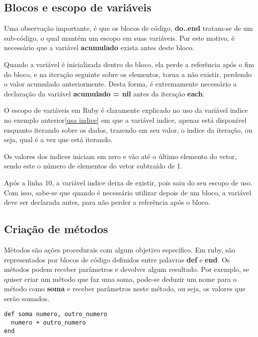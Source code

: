 \documentclass[espaco=simples,appendix=Name]{abnt}
\newcommand{\code}[1] {\textbf{#1}}
\begin{document}
\subsection{Blocos e escopo de variáveis}

Uma observação importante, é que os blocos de código, \code{do..end} tratam-se de um sub-código, o qual mantém um escopo em suas variáveis. Por este motivo, é necessário que a variável \code{acumulado} exista antes deste bloco. 

Quando a variável é inicializada dentro do bloco, ela perde a referência após o fim do bloco, e na iteração seguinte sobre os elementos, torna a não existir, perdendo o valor acumulado anteriormente. Desta forma, é extremamente necessário a declaração da variável \code{acumulado = nil} antes da iteração \code{each}.

O escopo de variáveis em Ruby é claramente explicado no uso da variável indice no exemplo anterior\ref{usa indice} em que a variável indice, apenas está disponível enquanto iterando sobre os dados, trazendo em seu valor, o indice da iteração, ou seja, qual é a vez que está iterando.

Os valores dos indices iniciam em zero e vão até o último elemento do vetor, sendo este o número de elementos do vetor subtraído de 1.

Após a linha 10, a variável indice deixa de existir, pois saiu do seu escopo de uso. Com isso, sabe-se que quando é necessário utilizar depois de um bloco, a variável deve ser declarada antes, para não perder a referência após o bloco.



\subsection{Criação de métodos}

Métodos são ações procedurais com algum objetivo específico. Em ruby, são representados por blocos de código definidos entre palavras \code{def} e \code{end}. Os métodos podem receber parâmetros e devolver algum resultado. Por exemplo, se quiser criar um método que faz uma soma, pode-se deduzir um nome para o método como \code{soma} e receber parâmetros neste método, ou seja, os valores que serão somados.

\begin{lstlisting}[caption=implementando um método de soma]
def soma numero, outro_numero
  numero + outro_numero
end
\end{lstlisting}
\end{document}

